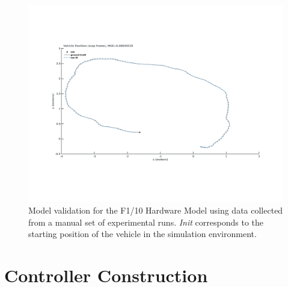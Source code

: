 \documentclass[manuscript,screen,review]{acmart}
\begin{document}
\begin{figure}[htbp]
  \centering
    \includegraphics[width=0.7\linewidth]{figures/validation.pdf}
   \caption{Model validation for the F1/10 Hardware Model using data collected from a manual set of experimental runs. \emph{Init} corresponds to the starting position of the vehicle in the simulation environment.}
  \label{fig:validation}
\end{figure}
\noindent 




\section{Controller Construction}
\end{document}
